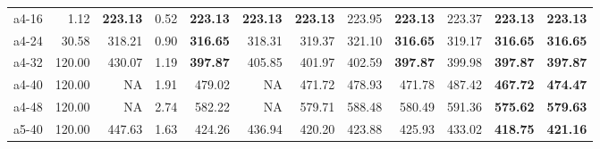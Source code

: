 \documentclass[aspectratio=1610]{beamer}
\begin{document}
\begin{frame}
\begin{table}[]
{\begin{tabular}{lrrrrrrrrrrr}
a4-16                                          & 1.12         & \multicolumn{1}{r|}{\textbf{223.13}}                        & 0.52              & \textbf{223.13} & \multicolumn{1}{r|}{{\color[HTML]{FE0000} \textbf{223.13}}} & \textbf{223.13} & \multicolumn{1}{r|}{223.95}   & \textbf{223.13} & \multicolumn{1}{r|}{223.37}                                 & \textbf{223.13} & {\color[HTML]{FE0000} \textbf{223.13}} \\
a4-24                                          & 30.58        & \multicolumn{1}{r|}{318.21}                                 & 0.90              & \textbf{316.65} & \multicolumn{1}{r|}{318.31}                                 & 319.37          & \multicolumn{1}{r|}{321.10}   & \textbf{316.65} & \multicolumn{1}{r|}{319.17}                                 & \textbf{316.65} & {\color[HTML]{FE0000} \textbf{316.65}} \\
a4-32                                          & 120.00       & \multicolumn{1}{r|}{430.07}                                 & 1.19              & \textbf{397.87} & \multicolumn{1}{r|}{405.85}                                 & 401.97          & \multicolumn{1}{r|}{402.59}   & \textbf{397.87} & \multicolumn{1}{r|}{399.98}                                 & \textbf{397.87} & {\color[HTML]{FE0000} \textbf{397.87}} \\
a4-40                                          & 120.00       & \multicolumn{1}{r|}{NA}                                     & 1.91              & 479.02          & \multicolumn{1}{r|}{NA}                                     & 471.72          & \multicolumn{1}{r|}{478.93}   & 471.78          & \multicolumn{1}{r|}{487.42}                                 & \textbf{467.72} & {\color[HTML]{FE0000} \textbf{474.47}} \\
a4-48                                          & 120.00       & \multicolumn{1}{r|}{NA}                                     & 2.74              & 582.22          & \multicolumn{1}{r|}{NA}                                     & 579.71          & \multicolumn{1}{r|}{588.48}   & 580.49          & \multicolumn{1}{r|}{591.36}                                 & \textbf{575.62} & {\color[HTML]{FE0000} \textbf{579.63}} \\
a5-40                                          & 120.00       & \multicolumn{1}{r|}{447.63}                                 & 1.63              & 424.26          & \multicolumn{1}{r|}{436.94}                                 & 420.20          & \multicolumn{1}{r|}{423.88}   & 425.93          & \multicolumn{1}{r|}{433.02}                                 & \textbf{418.75} & {\color[HTML]{FE0000} \textbf{421.16}} \\

\end{tabular}}
\end{table}
\end{frame}
\end{document}
